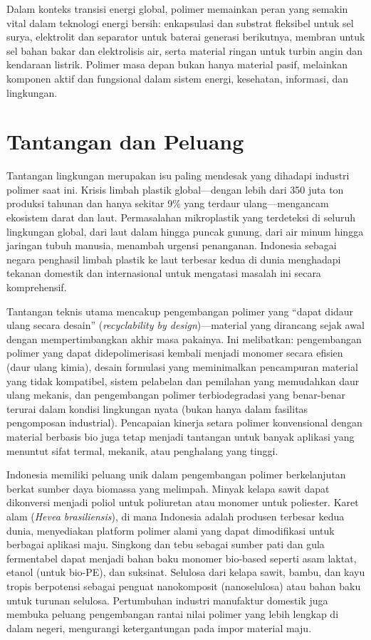 \documentclass[12pt,a4paper,openany]{book}
\begin{document}
Dalam konteks transisi energi global, polimer memainkan peran yang semakin vital dalam teknologi energi bersih: enkapsulasi dan substrat fleksibel untuk sel surya, elektrolit dan separator untuk baterai generasi berikutnya, membran untuk sel bahan bakar dan elektrolisis air, serta material ringan untuk turbin angin dan kendaraan listrik. Polimer masa depan bukan hanya material pasif, melainkan komponen aktif dan fungsional dalam sistem energi, kesehatan, informasi, dan lingkungan.

\section{Tantangan dan Peluang}

Tantangan lingkungan merupakan isu paling mendesak yang dihadapi industri polimer saat ini. Krisis limbah plastik global---dengan lebih dari 350 juta ton produksi tahunan dan hanya sekitar 9\% yang terdaur ulang---mengancam ekosistem darat dan laut. Permasalahan mikroplastik yang terdeteksi di seluruh lingkungan global, dari laut dalam hingga puncak gunung, dari air minum hingga jaringan tubuh manusia, menambah urgensi penanganan. Indonesia sebagai negara penghasil limbah plastik ke laut terbesar kedua di dunia menghadapi tekanan domestik dan internasional untuk mengatasi masalah ini secara komprehensif.

Tantangan teknis utama mencakup pengembangan polimer yang ``dapat didaur ulang secara desain'' (\textit{recyclability by design})---material yang dirancang sejak awal dengan mempertimbangkan akhir masa pakainya. Ini melibatkan: pengembangan polimer yang dapat didepolimerisasi kembali menjadi monomer secara efisien (daur ulang kimia), desain formulasi yang meminimalkan pencampuran material yang tidak kompatibel, sistem pelabelan dan pemilahan yang memudahkan daur ulang mekanis, dan pengembangan polimer terbiodegradasi yang benar-benar terurai dalam kondisi lingkungan nyata (bukan hanya dalam fasilitas pengomposan industrial). Pencapaian kinerja setara polimer konvensional dengan material berbasis bio juga tetap menjadi tantangan untuk banyak aplikasi yang menuntut sifat termal, mekanik, atau penghalang yang tinggi.

Indonesia memiliki peluang unik dalam pengembangan polimer berkelanjutan berkat sumber daya biomassa yang melimpah. Minyak kelapa sawit dapat dikonversi menjadi poliol untuk poliuretan atau monomer untuk poliester. Karet alam (\textit{Hevea brasiliensis}), di mana Indonesia adalah produsen terbesar kedua dunia, menyediakan platform polimer alami yang dapat dimodifikasi untuk berbagai aplikasi maju. Singkong dan tebu sebagai sumber pati dan gula fermentabel dapat menjadi bahan baku monomer bio-based seperti asam laktat, etanol (untuk bio-PE), dan suksinat. Selulosa dari kelapa sawit, bambu, dan kayu tropis berpotensi sebagai penguat nanokomposit (nanoselulosa) atau bahan baku untuk turunan selulosa. Pertumbuhan industri manufaktur domestik juga membuka peluang pengembangan rantai nilai polimer yang lebih lengkap di dalam negeri, mengurangi ketergantungan pada impor material maju.
\end{document}
